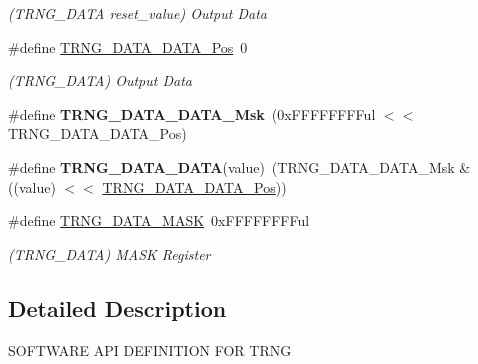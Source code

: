 \begin{DoxyCompactItemize}
\begin{DoxyCompactList}\small\item\em (T\+R\+N\+G\+\_\+\+D\+A\+T\+A reset\+\_\+value) Output Data \end{DoxyCompactList}\item 
\hypertarget{group___s_a_m_l21___t_r_n_g_ga035698e8396c02da8fc4ea1bcb16df68}{}\#define \hyperlink{group___s_a_m_l21___t_r_n_g_ga035698e8396c02da8fc4ea1bcb16df68}{T\+R\+N\+G\+\_\+\+D\+A\+T\+A\+\_\+\+D\+A\+T\+A\+\_\+\+Pos}~0\label{group___s_a_m_l21___t_r_n_g_ga035698e8396c02da8fc4ea1bcb16df68}

\begin{DoxyCompactList}\small\item\em (T\+R\+N\+G\+\_\+\+D\+A\+T\+A) Output Data \end{DoxyCompactList}\item 
\hypertarget{group___s_a_m_l21___t_r_n_g_gae943952453fb36fd690be0019d4e3016}{}\#define {\bfseries T\+R\+N\+G\+\_\+\+D\+A\+T\+A\+\_\+\+D\+A\+T\+A\+\_\+\+Msk}~(0x\+F\+F\+F\+F\+F\+F\+F\+Ful $<$$<$ T\+R\+N\+G\+\_\+\+D\+A\+T\+A\+\_\+\+D\+A\+T\+A\+\_\+\+Pos)\label{group___s_a_m_l21___t_r_n_g_gae943952453fb36fd690be0019d4e3016}

\item 
\hypertarget{group___s_a_m_l21___t_r_n_g_gabff27c0ecc3f78810dd698f11ce8a9d0}{}\#define {\bfseries T\+R\+N\+G\+\_\+\+D\+A\+T\+A\+\_\+\+D\+A\+T\+A}(value)~(T\+R\+N\+G\+\_\+\+D\+A\+T\+A\+\_\+\+D\+A\+T\+A\+\_\+\+Msk \& ((value) $<$$<$ \hyperlink{group___s_a_m_l21___t_r_n_g_ga035698e8396c02da8fc4ea1bcb16df68}{T\+R\+N\+G\+\_\+\+D\+A\+T\+A\+\_\+\+D\+A\+T\+A\+\_\+\+Pos}))\label{group___s_a_m_l21___t_r_n_g_gabff27c0ecc3f78810dd698f11ce8a9d0}

\item 
\hypertarget{group___s_a_m_l21___t_r_n_g_gaa72ae9d237b729be17e4941fdca32a8d}{}\#define \hyperlink{group___s_a_m_l21___t_r_n_g_gaa72ae9d237b729be17e4941fdca32a8d}{T\+R\+N\+G\+\_\+\+D\+A\+T\+A\+\_\+\+M\+A\+S\+K}~0x\+F\+F\+F\+F\+F\+F\+F\+Ful\label{group___s_a_m_l21___t_r_n_g_gaa72ae9d237b729be17e4941fdca32a8d}

\begin{DoxyCompactList}\small\item\em (T\+R\+N\+G\+\_\+\+D\+A\+T\+A) M\+A\+S\+K Register \end{DoxyCompactList}\end{DoxyCompactItemize}


\subsection{Detailed Description}
S\+O\+F\+T\+W\+A\+R\+E A\+P\+I D\+E\+F\+I\+N\+I\+T\+I\+O\+N F\+O\+R T\+R\+N\+G 